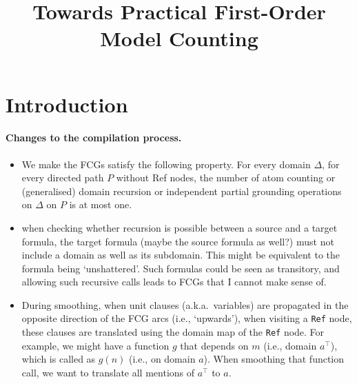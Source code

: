 \documentclass{article}
\title{Towards Practical First-Order Model Counting}
\begin{document}
\maketitle

\begin{abstract}
\end{abstract}

\section{Introduction}


\paragraph{Changes to the compilation process.}
\begin{itemize}
  \item We make the FCGs satisfy the following property. For every domain
        $\Delta$, for every directed path $P$ without Ref nodes, the number of
        atom counting or (generalised) domain recursion or independent partial
        grounding operations on $\Delta$ on $P$ is at most one.
  \item when checking whether recursion is possible between a source and a
        target formula, the target formula (maybe the source formula as well?)
        must not include a domain as well as its subdomain. This might be
        equivalent to the formula being `unshattered'. Such formulas could be
        seen as transitory, and allowing such recursive calls leads to FCGs that
        I cannot make sense of.
  \item During smoothing, when unit clauses (a.k.a.\ variables) are propagated
        in the opposite direction of the FCG arcs (i.e., `upwards'), when
        visiting a \texttt{Ref} node, these clauses are translated using the
        domain map of the \texttt{Ref} node. For example, we might have a
        function $g$ that depends on $m$ (i.e., domain $a^{\top}$), which is
        called as $g(n)$ (i.e., on domain $a$). When smoothing that function
        call, we want to translate all mentions of $a^{\top}$ to $a$.
\end{itemize}
\end{document}
